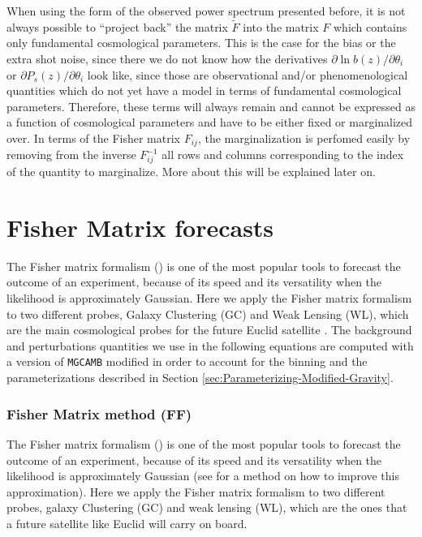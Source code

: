 When using the form of the observed power spectrum presented before,
it is not always possible to ``project back'' the matrix $\tilde{F}$
into the matrix $F$ which contains only fundamental cosmological
parameters. This is the case for the bias or the extra shot noise,
since there we do not know how the derivatives $\partial\ln b(z)/\partial\theta_{i}$
or $\partial P_{s}(z)/\partial\theta_{i}$ look like, since those
are observational and/or phenomenological quantities which do not
yet have a model in terms of fundamental cosmological parameters.
Therefore, these terms will always remain and cannot be expressed
as a function of cosmological parameters and have to be either fixed
or marginalized over. In terms of the Fisher matrix $F_{ij}$, the
marginalization is perfomed easily by removing from the inverse $F_{ij}^{-1}$
all rows and columns corresponding to the index of the quantity to
marginalize. More about this will be explained later on.


\section{\label{sec:Fisher-Matrix-method}Fisher Matrix forecasts}

The Fisher matrix formalism
(\cite{tegmark_measuring_1998,seo_improved_2007,seo_baryonic_2005})
is one of the most popular tools to forecast the outcome of an experiment,
because of its speed and its versatility when the likelihood is approximately
Gaussian. Here we apply the Fisher matrix formalism to two different
probes, Galaxy Clustering (GC) and Weak Lensing (WL), which are the
main cosmological probes for the future Euclid satellite \cite{mukherjee_planck_2008}.
The background and perturbations quantities we
use in the following equations are computed with a version of
\texttt{MGCAMB} \cite{zhao_searching_2009,hojjati_testing_2011}
modified in order to account for the binning and the parameterizations
described in Section \ref{sec:Parameterizing-Modified-Gravity}.

\subsubsection{\label{sec:Fisher-Matrix-method}Fisher Matrix method (FF)}

The Fisher matrix formalism (\cite{tegmark_measuring_1998,seo2007improved,seo2005baryonic})
is one of the most popular tools to forecast the outcome of an experiment,
because of its speed and its versatility when the likelihood is approximately
Gaussian (see \cite{sellentin_breaking_2014} for a method on how
to improve this approximation). Here we apply the Fisher matrix formalism
to two different probes, galaxy Clustering (GC) and weak lensing (WL),
which are the ones that a future satellite like Euclid \cite{amendola_cosmology_2012-short}
will carry on board.

